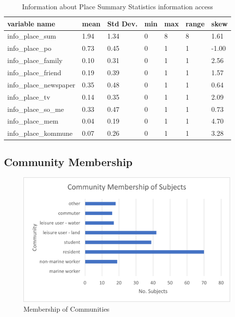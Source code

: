 \begin{center}
\begin{table}[h]
    \centering
    \begin{tabular}{|l|l|l|l|l|l|l|}
    \hline
        variable name & mean & Std Dev. & min & max & range & skew  \\ \hline
        info\_place\_sum & 1.94 & 1.34 & 0 & 8 & 8 & 1.61 \\ \hline
        info\_place\_po & 0.73 & 0.45 & 0 & 1 & 1 & -1.00  \\ \hline
        info\_place\_family & 0.10 & 0.31 & 0 & 1 & 1 & 2.56 \\ \hline
        info\_place\_friend & 0.19 & 0.39 & 0 & 1 & 1 & 1.57  \\ \hline
        info\_place\_newspaper & 0.35 & 0.48 & 0 & 1 & 1 & 0.64  \\ \hline
        info\_place\_tv & 0.14 & 0.35 & 0 & 1 & 1 & 2.09 \\ \hline
        info\_place\_so\_me & 0.33 & 0.47 & 0 & 1 & 1 & 0.73  \\ \hline
        info\_place\_mem & 0.04 & 0.19 & 0 & 1 & 1 & 4.70 \\ \hline
        info\_place\_kommune & 0.07 & 0.26 & 0 & 1 & 1 & 3.28\\ \hline
                
         \end{tabular}
    \caption{Information about Place Summary Statistics information access}
\label{table:summary_stats_info_access}
\end{table}
\end{center}



\subsection{Community Membership}

\begin{figure}[h]
    \centering
    \includegraphics{fig_results/com-mem-horizontal.png}
    \caption{Membership of Communities}
    \label{fig:my_label}
\end{figure}
